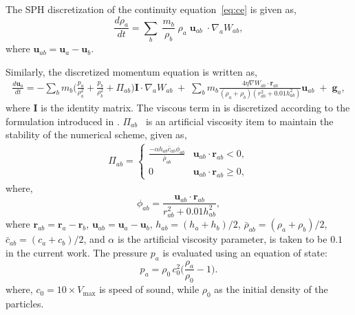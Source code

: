 \documentclass[preprint,12pt]{elsarticle}
\newcommand{\ten}[1]{\ensuremath{\mathbf{#1}}}
\begin{document}
The SPH discretization of the continuity
equation~\cref{eq:ce} is given as,
\begin{equation}
  \label{eq:sph-discretization-continuity}
  \frac{{d}\rho_a}{dt} = \sum_{b} \; \frac{m_b}{\rho_{b}} \;
  \rho_{a} \; {\ten{u}}_{ab} \; \cdot \nabla_{a} W_{ab},
\end{equation}
where $\ten{u}_{ab} = \ten{u}_a - \ten{u}_b$.

%
Similarly, the discretized momentum equation is written as,
\begin{multline}
  \label{eq:sph-momentum-fluid}
  \frac{{d}\ten{u}_{a}}{dt} = - \sum_{b} m_b
  \bigg(\frac{p_a}{\rho_a^2} + \frac{p_b}{\rho_b^2} + \Pi_{ab}\bigg) \ten{I} \cdot
  \nabla_{a} W_{ab}
 \;+\;
  \sum_{b} m_b \frac{4 \eta \nabla W_{ab}\cdot
    \ten{r}_{ab}}{(\rho_a + \rho_b) (r_{ab}^2 + 0.01 h_{ab}^2)} \ten{u}_{ab}  \;+\;
  \ten{g}_{a},
\end{multline}
where $\ten{I}$ is the identity matrix. The viscous term in  is discretized according to the
formulation introduced in
\cite{morris1997modeling}. $\Pi_{ab}$~\cite{monaghan-review:2005} is an
artificial viscosity item to maintain the stability of the numerical scheme,
given as,
\begin{align}
  \label{eq:mom-av}
  \Pi_{ab} =
  \begin{cases}
\frac{-\alpha h_{ab} \bar{c}_{ab} \phi_{ab}}{\bar{\rho}_{ab}}
  & \ten{u}_{ab}\cdot \ten{r}_{ab} < 0, \\
  0 & \ten{u}_{ab}\cdot \ten{r}_{ab} \ge 0,
\end{cases}
\end{align}
where,
%
\begin{equation}
  \label{eq:av-phiij}
  \phi_{ab} = \frac{\ten{u}_{ab} \cdot \ten{r}_{ab}}{r^2_{ab} + 0.01 h^2_{ab}},
\end{equation}
%
where $\ten{r}_{ab} = \ten{r}_a - \ten{r}_b$,
$\ten{u}_{ab} = \ten{u}_a - \ten{u}_b$, $h_{ab} = (h_a + h_b)/2$,
$\bar{\rho}_{ab} = (\rho_a + \rho_b)/2$, $\bar{c}_{ab} = (c_a + c_b) / 2$, and
$\alpha$ is the artificial viscosity parameter, is taken to be $0.1$ in the current
work. The pressure $p_a$ is evaluated using an equation of state:
\begin{equation}
\label{eqn:sph-eos}
  p_a = \rho_0 \, c_0^2 \bigg(\frac{\rho_a}{\rho_{0}} - 1 \bigg).
\end{equation}
where, $c_0=10 \times V_{\text{max}}$ is speed of sound, while $\rho_0$ as the
initial density of the particles.
\end{document}
